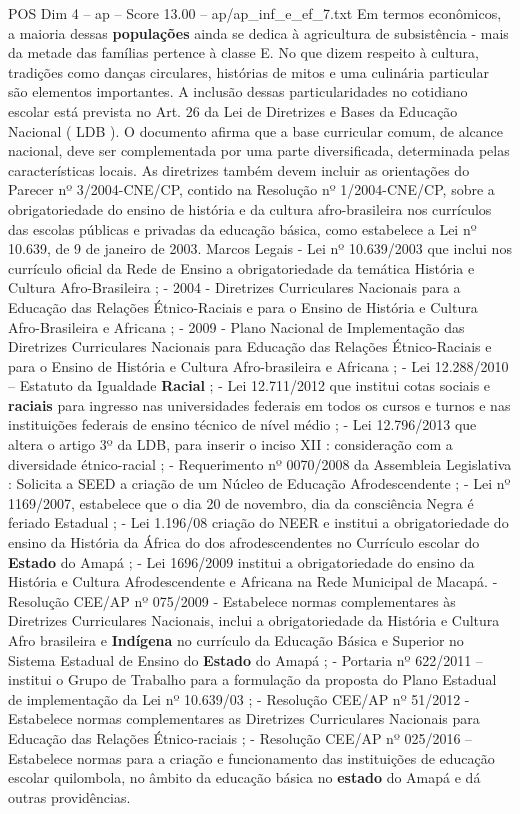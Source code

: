 \begin{textsample}{POS Dim 4 – ap – Score 13.00 – ap/ap\_inf\_e\_ef\_7.txt}
Em termos econômicos, a maioria dessas \textbf{populações} ainda se dedica à agricultura de subsistência - mais da metade das famílias pertence à classe E.
No que dizem respeito à cultura, tradições como danças circulares, histórias de mitos e uma culinária particular são elementos importantes.
A inclusão dessas particularidades no cotidiano escolar está prevista no Art. 26 da Lei de Diretrizes e Bases da Educação Nacional ( LDB ).
O documento afirma que a base curricular comum, de alcance nacional, deve ser complementada por uma parte diversificada, determinada pelas características locais.
As diretrizes também devem incluir as orientações do Parecer nº 3/2004-CNE/CP, contido na Resolução nº 1/2004-CNE/CP, sobre a obrigatoriedade do ensino de história e da cultura afro-brasileira nos currículos das escolas públicas e privadas da educação básica, como estabelece a Lei nº 10.639, de 9 de janeiro de 2003.
Marcos Legais - Lei nº 10.639/2003 que inclui nos currículo oficial da Rede de Ensino a obrigatoriedade da temática História e Cultura Afro-Brasileira ; - 2004 - Diretrizes Curriculares Nacionais para a Educação das Relações Étnico-Raciais e para o Ensino de História e Cultura Afro-Brasileira e Africana ; - 2009 - Plano Nacional de Implementação das Diretrizes Curriculares Nacionais para Educação das Relações Étnico-Raciais e para o Ensino de História e Cultura Afro-brasileira e Africana ; - Lei 12.288/2010 – Estatuto da Igualdade \textbf{Racial} ; - Lei 12.711/2012 que institui cotas sociais e \textbf{raciais} para ingresso nas universidades federais em todos os cursos e turnos e nas instituições federais de ensino técnico de nível médio ; - Lei 12.796/2013 que altera o artigo 3º da LDB, para inserir o inciso XII : consideração com a diversidade étnico-racial ; - Requerimento nº 0070/2008 da Assembleia Legislativa : Solicita a SEED a criação de um Núcleo de Educação Afrodescendente ; - Lei nº 1169/2007, estabelece que o dia 20 de novembro, dia da consciência Negra é feriado Estadual ; - Lei 1.196/08 criação do NEER e institui a obrigatoriedade do ensino da História da África do dos afrodescendentes no Currículo escolar do \textbf{Estado} do Amapá ; - Lei 1696/2009 institui a obrigatoriedade do ensino da História e Cultura Afrodescendente e Africana na Rede Municipal de Macapá. - Resolução CEE/AP nº 075/2009 - Estabelece normas complementares às Diretrizes Curriculares Nacionais, inclui a obrigatoriedade da História e Cultura Afro brasileira e \textbf{Indígena} no currículo da Educação Básica e Superior no Sistema Estadual de Ensino do \textbf{Estado} do Amapá ; - Portaria nº 622/2011 – institui o Grupo de Trabalho para a formulação da proposta do Plano Estadual de implementação da Lei nº 10.639/03 ; - Resolução CEE/AP nº 51/2012 - Estabelece normas complementares as Diretrizes Curriculares Nacionais para Educação das Relações Étnico-raciais ; - Resolução CEE/AP nº 025/2016 – Estabelece normas para a criação e funcionamento das instituições de educação escolar quilombola, no âmbito da educação básica no \textbf{estado} do Amapá e dá outras providências.

\end{textsample}
